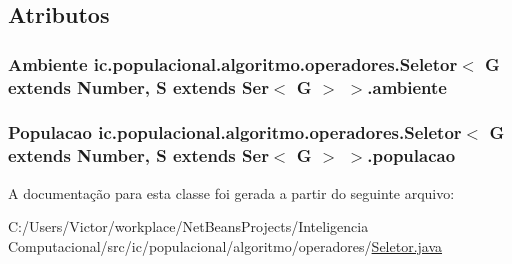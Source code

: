 \subsection{Atributos}
\hypertarget{classic_1_1populacional_1_1algoritmo_1_1operadores_1_1_seletor_3_01_g_01extends_01_number_00_01_23b601396f2a06ce9087495b09b33964_a354469d2739865e5bfcaa1707ed80048}{
\subsubsection[{ambiente}]{\setlength{\rightskip}{0pt plus 5cm}Ambiente ic.\-populacional.\-algoritmo.\-operadores.\-Seletor$<$ G extends Number, S extends Ser$<$ G $>$ $>$.ambiente\hspace{0.3cm}{\ttfamily [protected]}}}\label{classic_1_1populacional_1_1algoritmo_1_1operadores_1_1_seletor_3_01_g_01extends_01_number_00_01_23b601396f2a06ce9087495b09b33964_a354469d2739865e5bfcaa1707ed80048}
\hypertarget{classic_1_1populacional_1_1algoritmo_1_1operadores_1_1_seletor_3_01_g_01extends_01_number_00_01_23b601396f2a06ce9087495b09b33964_ac31141aeb3db4cbbd5f0f7db86cc6bae}{
\subsubsection[{populacao}]{\setlength{\rightskip}{0pt plus 5cm}Populacao ic.\-populacional.\-algoritmo.\-operadores.\-Seletor$<$ G extends Number, S extends Ser$<$ G $>$ $>$.populacao\hspace{0.3cm}{\ttfamily [protected]}}}\label{classic_1_1populacional_1_1algoritmo_1_1operadores_1_1_seletor_3_01_g_01extends_01_number_00_01_23b601396f2a06ce9087495b09b33964_ac31141aeb3db4cbbd5f0f7db86cc6bae}


A documentação para esta classe foi gerada a partir do seguinte arquivo\-:\begin{DoxyCompactItemize}
\item 
C\-:/\-Users/\-Victor/workplace/\-Net\-Beans\-Projects/\-Inteligencia Computacional/src/ic/populacional/algoritmo/operadores/\hyperlink{_seletor_8java}{Seletor.\-java}\end{DoxyCompactItemize}
